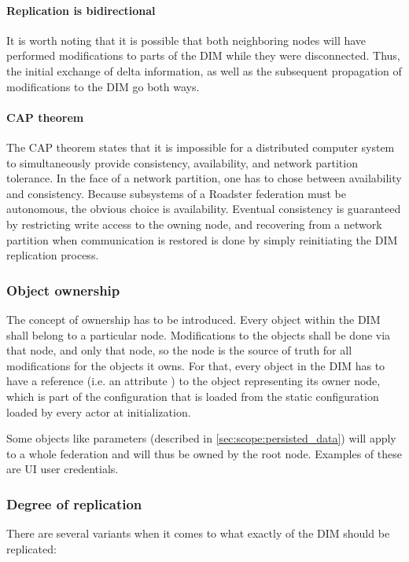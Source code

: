 \paragraph{Replication is bidirectional}
It is worth noting that it is possible that both neighboring nodes will have performed
modifications to parts of the DIM while they were
disconnected. Thus, the initial exchange of delta information, as well as the
subsequent propagation of modifications to the DIM go both ways.

\paragraph{CAP theorem}
The CAP theorem \cite{wp:cap} states that it is impossible for a distributed
computer system to simultaneously provide consistency, availability, and
network partition tolerance. In the face of a network partition, one has to
chose between availability and consistency. Because subsystems of a Roadster
federation must be autonomous, the obvious choice is availability. Eventual
consistency is guaranteed by restricting write access to the owning node, and
recovering from a network partition when communication is restored is done by
simply reinitiating the DIM replication process.

\subsubsection{Object ownership}
The concept of ownership has to be introduced. Every object within the DIM
shall belong to a particular node. Modifications to the objects shall be done via
that node, and only that node, so the node is the source of truth for all modifications for the
objects it owns. For that, every object in the DIM has to have a reference
(i.e. an attribute ) to the object representing its owner node, which is part of
the configuration that is loaded from the static configuration loaded by every
actor at initialization.

Some objects like parameters (described in \autoref{sec:scope:persisted_data})
will apply to a whole federation and will thus be owned by the root node.
Examples of these are UI user credentials.

\subsubsection{Degree of replication}
There are several variants when it comes to what exactly of the DIM should be replicated:


